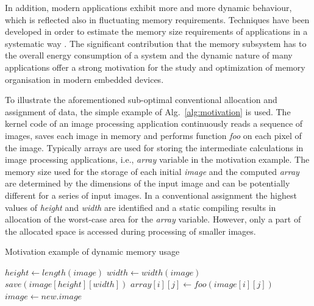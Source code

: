 \documentclass[a4paper,conference]{IEEEtran}
\begin{document}
In addition, modern applications exhibit more and more dynamic behaviour, which is reflected also in fluctuating memory requirements. Techniques have been developed in order to estimate the memory size requirements of applications in a systematic way \cite{Ang13}. The significant contribution that the memory subsystem has to the overall energy consumption of a system and the dynamic nature of many applications offer a strong motivation for the study and optimization of memory organisation in modern embedded devices.

To illustrate the aforementioned sub-optimal conventional allocation and assignment of data, the simple example of Alg.~\ref{alg:motivation} is used. The kernel code of an image processing application continuously reads a sequence of images, saves each image in memory and performs function \textit{foo} on each pixel of the image. Typically arrays are used for storing the intermediate calculations in image processing applications, i.e., \textit{array} variable in the motivation example. The memory size used for the storage of each initial \textit{image} and the computed \textit{array} are determined by the dimensions of the input image and can be potentially different for a series of input images. In a conventional assignment the highest values of \textit{height} and \textit{width} are identified and a static compiling results in allocation of the worst-case area for the \textit{array} variable. However, only a part of the allocated space is accessed during processing of smaller images. 

\begin{algorithm}[!t]
\caption{Motivation example of dynamic memory usage}
 \label{alg:motivation}
 \begin{algorithmic}[1]
		\STATE $height \gets length(image)$
		\STATE $width \gets width(image)$
		\STATE $save(image[height][width])$
					\STATE $array[i][j] \gets foo(image[i][j])$
				\ENDFOR
			\ENDFOR
		\STATE $image \gets new.image$	
	\ENDWHILE
 \end{algorithmic}
\end{algorithm}
\end{document}
